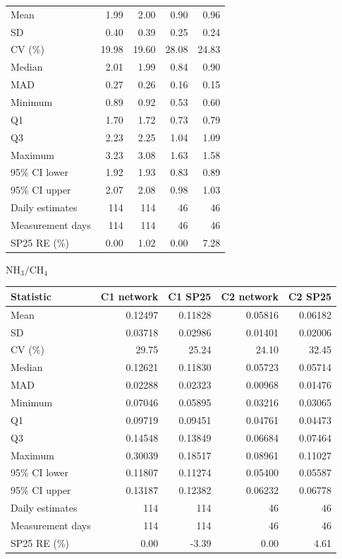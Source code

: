 \begin{table}
\begin{minipage}[t]{0.48\textwidth}
\begin{tabular}{lrrrr}
Mean & 1.99 & 2.00 & 0.90 & 0.96
\\
SD & 0.40 & 0.39 & 0.25 & 0.24
\\
CV (\%) & 19.98 & 19.60 & 28.08 & 24.83
\\
Median & 2.01 & 1.99 & 0.84 & 0.90
\\
MAD & 0.27 & 0.26 & 0.16 & 0.15
\\
Minimum & 0.89 & 0.92 & 0.53 & 0.60
\\
Q1 & 1.70 & 1.72 & 0.73 & 0.79
\\
Q3 & 2.23 & 2.25 & 1.04 & 1.09
\\
Maximum & 3.23 & 3.08 & 1.63 & 1.58
\\
95\% CI lower & 1.92 & 1.93 & 0.83 & 0.89
\\
95\% CI upper & 2.07 & 2.08 & 0.98 & 1.03
\\
Daily estimates & 114 & 114 & 46 & 46
\\
Measurement days & 114 & 114 & 46 & 46
\\
SP25 RE (\%) & 0.00 & 1.02 & 0.00 & 7.28
\\
\bottomrule
\end{tabular}
\end{minipage}
\hfill
\begin{minipage}[t]{0.48\textwidth}\centering\textbf{$\mathrm{NH_3}/\mathrm{CH_4}$}\par\vspace{1mm}
\begin{tabular}{lrrrr}
\toprule
Statistic & C1 network & C1 SP25 & C2 network & C2 SP25\\
\midrule
Mean & 0.12497 & 0.11828 & 0.05816 & 0.06182
\\
SD & 0.03718 & 0.02986 & 0.01401 & 0.02006
\\
CV (\%) & 29.75 & 25.24 & 24.10 & 32.45
\\
Median & 0.12621 & 0.11830 & 0.05723 & 0.05714
\\
MAD & 0.02288 & 0.02323 & 0.00968 & 0.01476
\\
Minimum & 0.07046 & 0.05895 & 0.03216 & 0.03065
\\
Q1 & 0.09719 & 0.09451 & 0.04761 & 0.04473
\\
Q3 & 0.14548 & 0.13849 & 0.06684 & 0.07464
\\
Maximum & 0.30039 & 0.18517 & 0.08961 & 0.11027
\\
95\% CI lower & 0.11807 & 0.11274 & 0.05400 & 0.05587
\\
95\% CI upper & 0.13187 & 0.12382 & 0.06232 & 0.06778
\\
Daily estimates & 114 & 114 & 46 & 46
\\
Measurement days & 114 & 114 & 46 & 46
\\
SP25 RE (\%) & 0.00 & -3.39 & 0.00 & 4.61
\\
\bottomrule
\end{tabular}
\end{minipage}

\end{table}
